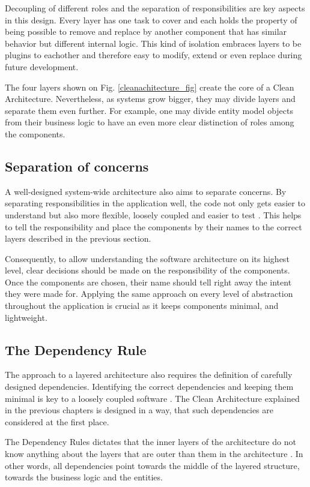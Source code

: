\documentclass[conference]{IEEEtran}
\begin{document}
Decoupling of different roles and the separation of responsibilities are key aspects in this design. Every layer has one task to cover and each holds the property of being possible to remove and replace by another component that has similar behavior but different internal logic. This kind of isolation embraces layers to be plugins to eachother and therefore easy to modify, extend or even replace during future development.

The four layers shown on Fig. \ref{cleanachitecture_fig} create the core of a Clean Architecture. Nevertheless, as systems grow bigger, they may divide layers and separate them even further. For example, one may divide entity model objects from their business logic to have an even more clear distinction of roles among the components.

\subsection{Separation of concerns}
A well-designed system-wide architecture also aims to separate concerns. By separating responsibilities in the application well, the code not only gets easier to understand but also more flexible, loosely coupled and easier to test  \cite{cleancoder} \cite{cleanarchitecture} \cite{onionarchitecture}. This helps to tell the responsibility and place the components by their names to the correct layers described in the previous section.

Consequently, to allow understanding the software architecture on its highest level, clear decisions should be made on the responsibility of the components. Once the components are chosen, their name should tell right away the intent they were made for. Applying the same approach on every level of abstraction throughout the application is crucial as it keeps components minimal, and lightweight. 

\subsection{The Dependency Rule}
The approach to a layered architecture also requires the definition of carefully designed dependencies. Identifying the correct dependencies and keeping them minimal is key to a loosely coupled software \cite{cleancode}. The Clean Architecture explained in the previous chapters is designed in a way, that such dependencies are considered at the first place.

The Dependency Rules dictates that the inner layers of the architecture do not know anything about the layers that are outer than them in the architecture \cite{cleanarchitecture} \cite{onionarchitecture}. In other words, all dependencies point towards the middle of the layered structure, towards the business logic and the entities. 
\end{document}
